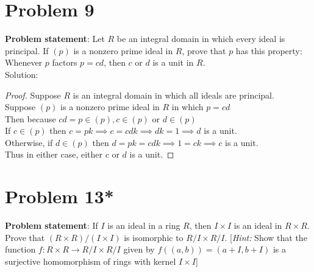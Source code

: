 \documentclass{article} %
\begin{document}
\newpage

\section*{Problem 9}


\textbf{Problem statement}: Let $R$ be an integral domain in which every ideal is principal.  If $(p)$ is a nonzero prime ideal in $R$, prove that $p$ has this property: Whenever $p$ factors $p = cd$, then $c$ or $d$ is a unit in $R$.
\\

Solution: 
\begin{addmargin}[1em]{0em}
\begin{proof}
Suppose $R$ is an integral domain in which all ideals are principal.
\\Suppose $(p)$ is a nonzero prime ideal in $R$ in which $p = cd$
\\Then because $cd = p \in (p), c \in (p)$ or $d \in (p)$
\\If $c \in (p)$ then $c = pk \implies c = cdk \implies dk = 1 \implies d$ is a unit.
\\Otherwise, if $d \in (p)$ then $d = pk = cdk \implies 1 = ck \implies c$ is a unit.
\\Thus in either case, either $c$ or $d$ is a unit.
\end{proof}
\end{addmargin}

\newpage

\section*{Problem 13*}


\textbf{Problem statement}: If $I$ is an ideal in a ring $R$, then $I \times I$ is an ideal in $R \times R$.  Prove that $(R \times R)/(I \times I)$ is isomorphic to $R/I \times R/I$. [\textit{Hint:} Show that the function $f: R \times R \rightarrow R/I \times R/I$ given by $f((a,b)) = (a + I, b + I)$ is a surjective homomorphism of rings with kernel $I \times I$]
\\
\end{document}
